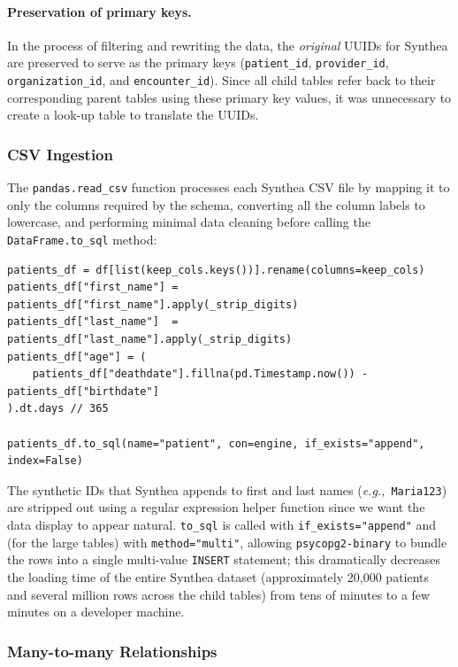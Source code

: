 \paragraph{Preservation of primary keys.} In the process of filtering and rewriting the data, the \emph{original} UUIDs for Synthea are preserved to serve as the primary keys (\texttt{patient\_id}, \texttt{provider\_id}, \texttt{organization\_id}, and \texttt{encounter\_id}). Since all child tables refer back to their corresponding parent tables using these primary key values, it was unnecessary to create a look-up table to translate the UUIDs.

\subsubsection*{CSV Ingestion}

The \texttt{pandas.read\_csv} function processes each Synthea CSV file by mapping it to only the columns required by the schema, converting all the column labels to lowercase, and performing minimal data cleaning before calling the \texttt{DataFrame.to\_sql} method:

\begin{lstlisting}[style=pythonstyle]
patients_df = df[list(keep_cols.keys())].rename(columns=keep_cols)
patients_df["first_name"] = patients_df["first_name"].apply(_strip_digits)
patients_df["last_name"]  = patients_df["last_name"].apply(_strip_digits)
patients_df["age"] = (
    patients_df["deathdate"].fillna(pd.Timestamp.now()) - patients_df["birthdate"]
).dt.days // 365

patients_df.to_sql(name="patient", con=engine, if_exists="append", index=False)
\end{lstlisting}

\noindent The synthetic IDs that Synthea appends to first and last names (\textit{e.g.,}\ \texttt{Maria123}) are stripped out using a regular expression helper function since we want the data display to appear natural. \texttt{to\_sql} is called with \texttt{if\_exists="append"} and (for the large tables) with \texttt{method="multi"}, allowing \texttt{psycopg2-binary} to bundle the rows into a single multi-value \texttt{INSERT} statement; this dramatically decreases the loading time of the entire Synthea dataset (approximately 20{,}000 patients and several million rows across the child tables) from tens of minutes to a few minutes on a developer machine.

\subsubsection*{Many-to-many Relationships}

